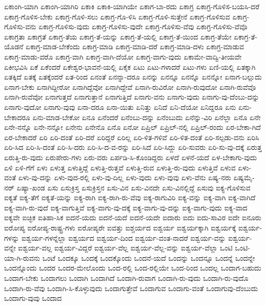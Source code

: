 {ಏಕಾಂಗಿ-ಯಾಗಿ
ಏಕಾಂಗಿ-ಯಾಗಿರಿ
ಏಕಾಕಿ
ಏಕಾಕಿ-ಯಾಗಿಯೇ
ಏಕಾಗ-ಬಾ-ರದು
ಏಕಾಗ್ರ
ಏಕಾಗ್ರ-ಗೊಳಿಸ-ಬಯಸಿ-ದರೆ
ಏಕಾಗ್ರ-ಗೊಳಿಸ-ಬೇಕು
ಏಕಾಗ್ರ-ಗೊಳಿ-ಸಲು
ಏಕಾಗ್ರ-ಗೊ-ಳಿಸಿ
ಏಕಾಗ್ರ-ಗೊಳಿ-ಸುತ್ತೇನೆ
ಏಕಾಗ್ರ-ಗೊಳಿಸುವ
ಏಕಾಗ್ರ-ಗೊಳಿಸು-ವನು
ಏಕಾಗ್ರ-ಗೊಳಿಸು-ವುದು
ಏಕಾಗ್ರ-ಗೊಳಿಸು-ವುದೇ
ಏಕಾಗ್ರ-ಗೊಳಿಸು-ವೆವು
ಏಕಾಗ್ರ-ಗೊಳಿಸು-ವೆವೊ
ಏಕಾಗ್ರತಾ
ಏಕಾಗ್ರತೆ
ಏಕಾಗ್ರ-ತೆಯ
ಏಕಾಗ್ರ-ತೆ-ಯನ್ನು
ಏಕಾಗ್ರ-ತೆ-ಯಲ್ಲಿ
ಏಕಾಗ್ರ-ತೆ-ಯಿಂದ
ಏಕಾಗ್ರ-ತೆಯೇ
ಏಕಾಗ್ರ-ತೆ-ಯೊಡನೆ
ಏಕಾಗ್ರ-ಮಾಡ-ಬೇಕೆಂದು
ಏಕಾಗ್ರ-ಮಾಡಿ
ಏಕಾಗ್ರ-ಮಾಡಿ-ದರೆ
ಏಕಾಗ್ರ-ಮಾಡಿ-ದಳು
ಏಕಾಗ್ರ-ಮಾಡುವ
ಏಕಾಗ್ರ-ಮಾಡು-ವರೊ
ಏಕಾಗ್ರ-ವಾಗಿ
ಏಕಾಗ್ರ-ವಾಗಿ-ದೆಯೋ
ಏಕಾಗ್ರ-ವಾಗು-ವುದು
ಏಕಾಮೇ-ವಾದ್ವಿ-ತೀಯವೇ
ಏಕೀಭವಿಸಿ
ಏಕೆ
ಏಕೆಂದರೆ
ಏಕೇಶ್ವರ-ಭಾವನೆ-ಯಲ್ಲಿ
ಏಕೈಕ
ಏಟು
ಏಟು-ಗಳಾದರೆ
ಏಟು-ಗಳು
ಏಣಿ-ಯಲ್ಲಿ
ಏತಕ್ಕಾಗಿ
ಏತಕ್ಕಿದೆ
ಏತಕ್ಕೆ
ಏತಕ್ಕೆಂದರೆ
ಏತ-ರಿಂದ
ಏನಂತೆ
ಏನನ್ನಾ-ದರೂ
ಏನನ್ನು
ಏನನ್ನೂ
ಏನನ್ನೊ
ಏನನ್ನೋ
ಏನಾಗ-ಬಲ್ಲುದು
ಏನಾಗ-ಬೇಕು
ಏನಾಗಿದ್ದೀರೋ
ಏನಾಗಿದ್ದೆವೋ
ಏನಾಗಿದ್ದೇವೆ
ಏನಾಗಿ-ರುವಿರೋ
ಏನಾಗಿ-ರುವುದೋ
ಏನಾಗಿ-ರುವೆವೊ
ಏನಾಗಿ-ರುವೆವೋ
ಏನಾಗುತ್ತದೆ
ಏನಾಗುತ್ತಾನೆ
ಏನಾಗುತ್ತಿದೆ
ಏನಾಗು-ವನು
ಏನಾಗು-ವುದು
ಏನಾಗು-ವು-ದೆಂಬು-ದನ್ನು
ಏನಾಗು-ವುದೋ
ಏನಾಗು-ವುವು
ಏನಾ-ದರೂ
ಏನಾ-ಯಿತು
ಏನಿತ್ತು
ಏನಿದೆ
ಏನಿ-ದೆಯೋ
ಏನಿದ್ದರೂ
ಏನು
ಏನು-ಬೇಕಾದರೂ
ಏನು-ಮಾಡ-ಬೇಕೋ
ಏನೂ
ಏನೆಂದರೆ
ಏನೆಂಬು-ದನ್ನು
ಏನೆಂಬುದು
ಏನೆನ್ನು-ವಿರಿ
ಏನೆಲ್ಲಾ
ಏನೊ
ಏನೇ
ಏನೇ-ನನ್ನೊ
ಏನೇ-ನನ್ನೋ
ಏನೇನು
ಏನೇನೊ
ಏನೊ
ಏನೋ
ಏಪ್ರಿಲ್
ಏಪ್ರಿಲ್-ನಲ್ಲಿ
ಏಪ್ರಿಲ್-ರಂದು
ಏರ-ಬೇಕಾ-ಗಿದೆ
ಏರ-ಬೇಕಾದರೆ
ಏರಿ
ಏರಿ-ದಂತೆ
ಏರಿ-ದರೆ
ಏರಿದ್ದರೆ
ಏರಿಲ್ಲ
ಏರಿ-ಳಿತ-ಗಳಿವೆ
ಏರಿ-ಳಿತ-ದಂತೆ
ಏರಿ-ಸಲ್ಪಡು-ವನು
ಏರಿಸಿ
ಏರಿ-ಸಿದ
ಏರಿ-ಸಿ-ದಂತೆ
ಏರಿ-ಸಿ-ದರು
ಏರಿ-ಸಿ-ದ-ವ-ರನ್ನು
ಏರಿ-ಸಿದೆ
ಏರಿ-ಸಿದ್ದು
ಏರಿ-ಸುವರು
ಏರಿ-ಸು-ವು-ದಕ್ಕೆ
ಏರುತ್ತ
ಏರುತ್ತಿ-ರು-ವುದು
ಏರುಪೇರು-ಗಳು
ಏರು-ವರು
ಏರ್ಪಡಿ-ಸಿ-ಕೊಂಡಿದ್ದರು
ಏಳದೆ
ಏಳನೆ-ಯದೆ
ಏಳ-ಬೇಕಾಗು-ವುದು
ಏಳಿ
ಏಳಿ-ಗೆಗೆ
ಏಳು
ಏಳುತ್ತ
ಏಳುತ್ತಿದ್ದೆ
ಏಳುತ್ತಿ-ರುತ್ತವೆ
ಏಳುತ್ತಿ-ರುವ
ಏಳುತ್ತಿ-ರು-ವುದು
ಏಳುತ್ತಿವೆ
ಏಳುವ
ಏಳು-ವಂತೆ
ಏಳು-ವು-ದನ್ನು
ಏಳು-ವುದ-ರಲ್ಲಿ
ಏಳು-ವು-ದಿಲ್ಲ
ಏಳು-ವುದು
ಏಳು-ವುವು
ಏಳು-ವೆನು
ಏಷ್ಯ-ನರು
ಏಷ್ಯಮೈ-ನರ್
ಏಷ್ಯಾ-ಖಂಡ
ಏಸು
ಏಸುಕ್ರಿಸ್ತ
ಏಸುಕ್ರಿಸ್ತನ
ಏಸು-ವಿನ
ಏಸು-ವಿನದೇ
ಏಸು-ವಿನಲ್ಲಿದ್ದೆ
ಏಸುವು
ಐಕ್ಯ-ಗೊಳಿಸುವ
ಐಕ್ಯತೆ
ಐಕ್ಯ-ತೆಗೆ
ಐಕ್ಯತೆ-ಯನ್ನು
ಐಕ್ಯ-ರಾಗಿ
ಐಕ್ಯ-ರಾಗಿ-ರು-ವೆವು
ಐಕ್ಯ-ರಾಗುವಿರಿ
ಐಕ್ಯ-ವನ್ನು
ಐಕ್ಯ-ವಾಗಿ
ಐಕ್ಯ-ವಾಗಿದೆ
ಐಕ್ಯ-ವಾಗಿ-ರು-ವುದೆ
ಐಕ್ಯ-ವಾಗುತ್ತಿವೆ
ಐಕ್ಯ-ವಾಗು-ವು-ದಕ್ಕೆ
ಐಕ್ಯ-ವಾಗು-ವು-ದನ್ನು
ಐಕ್ಯ-ವಾಗು-ವುದು
ಐಕ್ಯ-ವಾದ
ಐಕ್ಯವೇ
ಐಚ್ಛಿಕ
ಐತಿಹಾ-ಸಿಕ
ಐದನೆ-ಯದು
ಐದನೆ-ಯದೆ
ಐದನೆ-ಯದೇ
ಐದಾರು
ಐದು
ಐದು-ಸಾವಿರ
ಐದೇ
ಐನೂರು
ಐರೋಪ್ಯ
ಐರೋಪ್ಯ-ರಾಷ್ಟ್ರ-ಗಳು
ಐರೋಪ್ಯರೇ
ಐವತ್ತು
ಐಶ್ಚರ್ಯದ
ಐಶ್ವರ್ಯ
ಐಶ್ವರ್ಯಕ್ಕಾಗಿ
ಐಶ್ವರ್ಯಕ್ಕೆ
ಐಶ್ವರ್ಯ-ಗಳನ್ನು
ಐಶ್ವರ್ಯ-ಗಳನ್ನೆಲ್ಲಾ
ಐಶ್ವರ್ಯದ
ಐಶ್ವರ್ಯ-ದಿಂದ
ಐಶ್ವರ್ಯ-ವಂತ-ನಾದರೆ
ಐಶ್ವರ್ಯ-ವನ್ನು
ಐಶ್ವರ್ಯ-ವನ್ನೇ
ಐಶ್ವರ್ಯ-ವಲ್ಲ
ಐಶ್ವರ್ಯ-ವಿದ್ದರೆ
ಐಶ್ವರ್ಯ-ವೆಲ್ಲ
ಐಶ್ವರ್ಯ-ವೆಲ್ಲ-ವನ್ನು
ಐಶ್ವರ್ಯ-ವೆಲ್ಲಾ
ಒಂಟಿ
ಒಂಟಿ-ಯಾ-ಗಿ-ರುವನು
ಒಂಟೆ
ಒಂದಕ್ಕೂ
ಒಂದಕ್ಕೆ
ಒಂದಕ್ಕೊಂದು
ಒಂದನೆ-ಯದೆ
ಒಂದನ್ನು
ಒಂದನ್ನೂ
ಒಂದನ್ನೆ
ಒಂದನ್ನೇ
ಒಂದನ್ನೊಂದು
ಒಂದರ
ಒಂದರ-ಮೇಲೊಂದು
ಒಂದ-ರಲ್ಲಿ
ಒಂದ-ರಲ್ಲಿಯೇ
ಒಂದ-ರಿಂದ
ಒಂದಲ್ಲ
ಒಂದಾಗ-ಬಹುದು
ಒಂದಾಗ-ಬೇಕು
ಒಂದಾಗಲು
ಒಂದಾಗಿ
ಒಂದಾಗಿದೆ
ಒಂದಾಗಿ-ರುವಾಗ
ಒಂದಾಗಿ-ರು-ವುದು
ಒಂದಾಗಿ-ರು-ವುದೊ
ಒಂದಾಗಿ-ರು-ವೆವು
ಒಂದಾಗಿ-ಸಿ-ಕೊಳ್ಳುವುದು
ಒಂದಾಗುತ್ತೇವೆ
ಒಂದಾಗುವ
ಒಂದಾಗು-ವಂತೆ
ಒಂದಾಗುವು-ದೆಂಬುದು
ಒಂದಾಗು-ವುವು
ಒಂದಾದ
}
